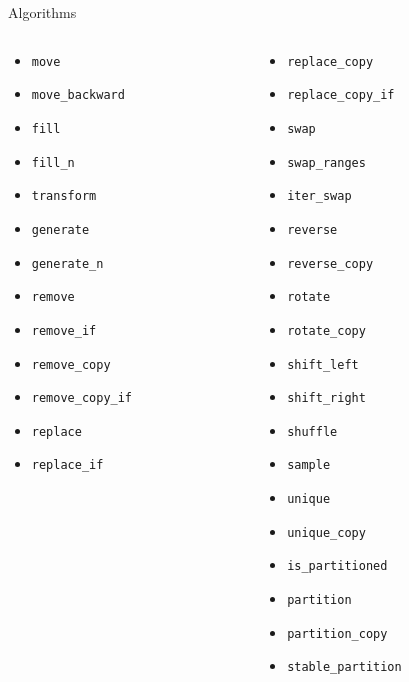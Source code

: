 \documentclass[aspectratio=169]{beamer}
\begin{document}
\begin{frame}{Algorithms}
\begin{columns}
\begin{column}{.33\textwidth}
\begin{itemize}
        \item{\texttt{move}}
        \item{\texttt{move_backward}}
        \item{\texttt{fill}}
        \item{\texttt{fill_n}}
        \item{\texttt{transform}}
        \item{\texttt{generate}}
        \item{\texttt{generate_n}}
        \item{\texttt{remove}}
        \item{\texttt{remove_if}}
        \item{\texttt{remove_copy}}
        \item{\texttt{remove_copy_if}}
        \item{\texttt{replace}}
        \item{\texttt{replace_if}}
      \end{itemize}
    \end{column}
    \begin{column}{.33\textwidth}
      \begin{itemize}
        \item{\texttt{replace_copy}}
        \item{\texttt{replace_copy_if}}
        \item{\texttt{swap}}
        \item{\texttt{swap_ranges}}
        \item{\texttt{iter_swap}}
        \item{\texttt{reverse}}
        \item{\texttt{reverse_copy}}
        \item{\texttt{rotate}}
        \item{\texttt{rotate_copy}}
        \item{\texttt{shift_left}}
        \item{\texttt{shift_right}}
        \item{\texttt{shuffle}}
        \item{\texttt{sample}}
        \item{\texttt{unique}}
        \item{\texttt{unique_copy}}
        \item{\texttt{is_partitioned}}
        \item{\texttt{partition}}
        \item{\texttt{partition_copy}}
        \item{\texttt{stable_partition}}
      \end{itemize}
    \end{column}
  \end{columns}
\end{frame}
\end{document}
